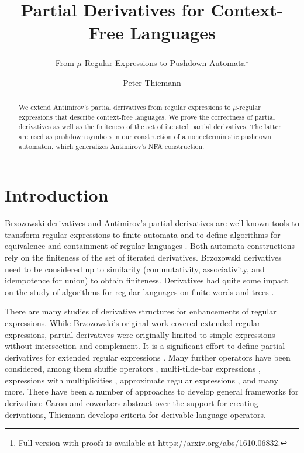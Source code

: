 \documentclass[runningheads, envcountsame, a4paper]{llncs}
\title{Partial Derivatives for Context-Free Languages}
\subtitle{From $\mu$-Regular Expressions to Pushdown
  Automata\footnote{Full version with proofs is available at \url{https://arxiv.org/abs/1610.06832}.}}
\author{Peter Thiemann}
\institute{University of Freiburg}
\begin{document}
\maketitle
\setcounter{footnote}{0}
\begin{abstract}
  We extend Antimirov's partial derivatives from regular expressions
  to $\mu$-regular expressions that describe context-free languages.
  We prove the correctness of partial derivatives as well as the
  finiteness of the set of iterated partial derivatives. The latter
  are used as pushdown symbols in our construction of a
  nondeterministic pushdown automaton, which generalizes Antimirov's NFA
  construction.
\end{abstract}
\section{Introduction}
\label{sec:introduction}

Brzozowski derivatives \cite{321249} and Antimirov's partial derivatives \cite{Antimirov96Partial} are
well-known tools to transform  regular expressions to finite automata and to define algorithms for
equivalence and containment of regular languages \cite{AntimirovIneq,Grabmayer:2005:UPC:2156157.2156171}.
Both automata constructions rely on the finiteness of the
set of iterated derivatives. Brzozowski derivatives need to be considered up to similarity
(commutativity, associativity, and idempotence for union) to obtain finiteness.  
Derivatives had quite some impact on the study of
algorithms for regular languages on finite words and trees \cite{DBLP:conf/rta/RouV03,CaronChamparnaudMignot2011}.

There are many studies of derivative structures for enhancements of regular expressions.
While Brzozowski's original work covered extended regular
expressions, partial derivatives were originally limited to simple expressions without intersection and
complement. It is a significant effort to define partial derivatives for extended regular expressions
\cite{CaronChamparnaudMignot2011}. Many further operators have been
considered, among them shuffle operators
\cite{DBLP:conf/lata/SulzmannT15},  multi-tilde-bar
expressions  \cite{DBLP:conf/wia/CaronCM12}, expressions with
multiplicities \cite{DBLP:journals/tcs/LombardyS05}, approximate
regular expressions  \cite{DBLP:conf/lata/ChamparnaudJM12}, and many
more. There have been a number of approaches to develop general
frameworks for derivation: Caron and coworkers
\cite{DBLP:journals/ita/CaronCM14} abstract over the support for
creating derivations, Thiemann \cite{DBLP:conf/wia/Thiemann16}
develops criteria for derivable language operators.
\end{document}
